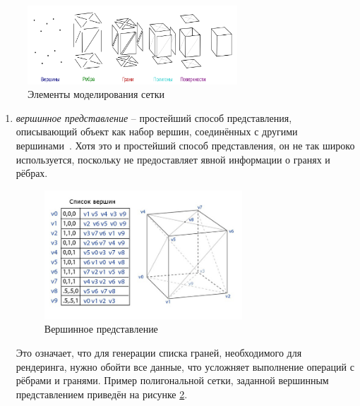 \begin{figure}[h] 
	\centering
	\includegraphics[width=0.7\textwidth]{images/polygonal-models-example.png}
	\caption{Элементы моделирования сетки} 
	\label{fig:polygonal-models-example} 
\end{figure}

\begin{enumerate}
	\item \textit{вершинное представление} -- простейший способ представления, описывающий объект как набор вершин, соединённых с другими вершинами~\cite{lit2}. Хотя это и простейший способ представления, он не так широко используется, поскольку не предоставляет явной информации о гранях и рёбрах. 
	\begin{figure}[h] 
		\centering
		\includegraphics[width=0.7\textwidth]{images/vertex-list.png}
		\caption{Вершинное представление} 
		\label{fig:vertex-list} 
	\end{figure}
	Это означает, что для генерации списка граней, необходимого для рендеринга, нужно обойти все данные, что усложняет выполнение операций с рёбрами и гранями. Пример полигональной сетки, заданной вершинным представлением приведён на рисунке \ref{fig:vertex-list}.
	

\end{enumerate}
